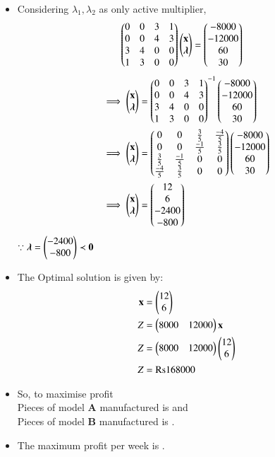 \begin{itemize}
\begin{align}
\end{align}
\item Considering $\lambda_1,\lambda_2$ as only active multiplier,
\begin{align}
    \begin{pmatrix}0 & 0 & 3 & 1  \\ 0 & 0 & 4 & 3 \\ 3 & 4 & 0 & 0 \\1 & 3 & 0 & 0\end{pmatrix}\begin{pmatrix}\mathbf{x}\\ \boldsymbol{\lambda}\end{pmatrix} &= \begin{pmatrix}-8000 \\ -12000 \\ 60 \\ 30\end{pmatrix}
\end{align}
\begin{align}
 \implies   \begin{pmatrix}\mathbf{x} \\ \boldsymbol{\lambda}\end{pmatrix} &=  \begin{pmatrix}0 & 0 & 3 & 1  \\ 0 & 0 & 4 & 3 \\ 3 & 4 & 0 & 0 \\1 & 3 & 0 & 0\end{pmatrix} ^{-1}\begin{pmatrix}-8000 \\ -12000 \\ 60 \\ 30\end{pmatrix}
    \\
    \implies   \begin{pmatrix}\mathbf{x} \\ \boldsymbol{\lambda}\end{pmatrix} &= \begin{pmatrix}0 & 0 & \frac{3}{5} & \frac{-4}{5} \\ 0 & 0 & \frac{-1}{5} & \frac{3}{5} \\ \frac{3}{5} & \frac{-1}{5} & 0 & 0 \\ \frac{-4}{5} & \frac{3}{5} & 0 & 0\end{pmatrix}\begin{pmatrix}-8000 \\ -12000 \\ 60 \\ 30\end{pmatrix}
    \\
    \implies \begin{pmatrix}\mathbf{x} \\ \boldsymbol{\lambda}\end{pmatrix} &= \begin{pmatrix}12 \\6 \\ -2400 \\ -800 \end{pmatrix}
\end{align}
$\because \boldsymbol{\lambda}=\begin{pmatrix}-2400 \\ -800\end{pmatrix} \prec \mathbf{0}$
\\
\item The Optimal solution is given by:
\begin{align}
    \mathbf{x} &= \begin{pmatrix}12\\6\end{pmatrix} \\
    Z &= \begin{pmatrix}8000&12000\end{pmatrix}\mathbf{x} \\
   Z &= \begin{pmatrix}8000&12000\end{pmatrix}\begin{pmatrix}12 \\ 6\end{pmatrix} \\
    Z&= \text{Rs} 168000
\end{align}
\item So, to maximise profit
\\
 Pieces of model \textbf{A} manufactured is  and
 \\
  Pieces of model \textbf{B} manufactured is .
\item The maximum profit per week is  .


\end{itemize}
